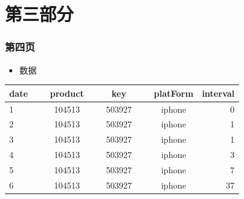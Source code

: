 \documentclass[notheorems,mathserif,table,Singapore]{beamer}
\begin{document}
\section{第三部分}
\begin{frame}
\frametitle{第四页}

\begin{itemize}
\item \small 数据
\end{itemize}
\begin{table}[h]\tiny
\begin{tabular}{l c c c c c c r}
\hline
date &\ & product & \ & key &\ & platForm & interval\\
\hline
1		 &\  & 104513 &\ 	& 503927 &\ 	&  iphone &0\\
2           &\  & 104513 &\    & 503927 &\ 	&  iphone &1\\
3 	         &\  & 104513 &\    & 503927 &\ 	&  iphone & 1\\
4           &\  & 104513 &\    & 503927 &\ 	&  iphone &3\\
5         &\  & 104513 &\    & 503927 &\ 	&  iphone &7\\
6         &\  & 104513 &\    & 503927 &\ 	&  iphone &37\\
\hline
\end{tabular}
\end{table}
\end{frame}
\end{document}
